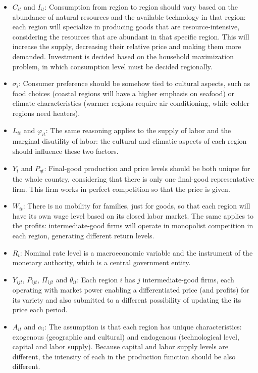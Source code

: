 \documentclass[
	thesis.tex
	]{subfiles}
\begin{document}
\begin{itemize}
	\item \(C_{it}\) and \(I_{it}\): Consumption from region to region should vary based on the abundance of natural resources and the available technology in that region: each region will specialize in producing goods that are resource-intensive, considering the resources that are abundant in that specific region. This will increase the supply, decreasing their relative price and making them more demanded. Investment is decided based on the household maximization problem, in which consumption level must be decided regionally.
	
	\item \(\sigma_i\): Consumer preference should be somehow tied to cultural aspects, such as food choices (coastal regions will have a higher emphasis on seafood) or climate characteristics (warmer regions require air conditioning, while colder regions need heaters).
	
	\item \(L_{it}\) and \(\varphi_{it}\): The same reasoning applies to the supply of labor and the marginal disutility of labor: the cultural and climatic aspects of each region should influence these two factors.
	
	\item \(Y_t\) and \(P_{\eta t}\): Final-good production and price levels should be both unique for the whole country, considering that there is only one final-good representative firm. This firm works in perfect competition so that the price is given.
	
	\item \(W_{it}\): There is no mobility for families, just for goods, so that each region will have its own wage level based on its closed labor market. The same applies to the profits: intermediate-good firms will operate in monopolist competition in each region, generating different return levels.
	
	\item  \(R_t\): Nominal rate level is a macroeconomic variable and the instrument of the monetary authority, which is a central government entity.
	
	\item \(Y_{ijt}\), \(P_{ijt}\), \(\Pi_{ijt}\) and \(\theta_{it}\): Each region $i$ has $j$ intermediate-good firms, each operating with market power enabling a differentiated price (and profits) for its variety and also submitted to a different possibility of updating the its price each period.
	
	\item \(A_{it}\) and \(\alpha_i\): The assumption is that each region has unique characteristics: exogenous (geographic and cultural) and endogenous (technological level, capital and labor supply). Because capital and labor supply levels are different, the intensity of each in the production function should be also different.
\end{itemize}
\end{document}
